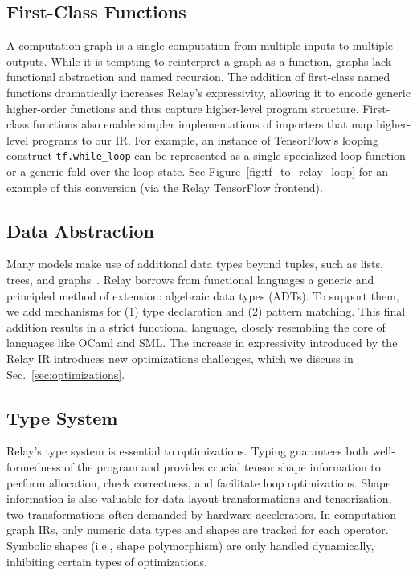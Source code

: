 \subsection*{First-Class Functions}

A computation graph is a single computation
  from multiple inputs to multiple outputs.
While it is tempting to reinterpret a graph as a function,
  graphs lack functional abstraction and named recursion.
The addition of first-class named functions dramatically increases
  Relay's expressivity, allowing it to encode generic
  higher-order functions and thus capture higher-level program structure.
First-class functions also enable simpler implementations
  of importers that map higher-level programs to our IR.
For example, an instance of TensorFlow's looping construct \verb|tf.while_loop|
  can be represented as a single specialized loop function
  or a generic fold over the loop state.
See Figure~\ref{fig:tf_to_relay_loop} for an example of this conversion (via
  the Relay TensorFlow frontend).

\subsection*{Data Abstraction}
Many models make use of additional data types beyond
  tuples, such as lists, trees, and graphs~\citep{char-rnn, tree_lstm, graph_lstm}.
Relay borrows from functional languages
  a generic and principled method of extension:
  algebraic data types (ADTs).
To support them, we add mechanisms for
  (1) type declaration and
  (2) pattern matching.
This final addition results in a strict functional language,
  closely resembling the core of languages like OCaml and SML.
The increase in expressivity introduced by the Relay IR introduces
  new optimizations challenges, which we
  discuss in Sec.~\ref{sec:optimizations}.

\subsection{Type System}
\label{subsec:type_system}

Relay's type system is essential
  to optimizations.
Typing guarantees both well-formedness of the program
  and provides crucial tensor shape information to perform allocation,
  check correctness, and facilitate loop optimizations.
Shape information is also valuable for data layout transformations and tensorization,
  two transformations often demanded by hardware accelerators.
In computation graph IRs, only numeric data types
  and shapes are tracked for each operator.
Symbolic shapes (i.e., shape polymorphism) are only handled
  dynamically, inhibiting certain types of optimizations.

